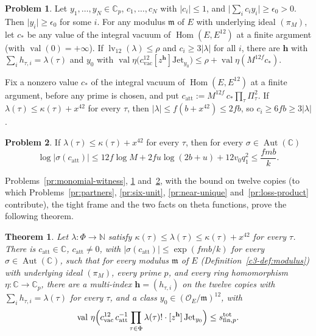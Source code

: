 \documentclass[reqno]{amsart}
\theoremstyle{definition}
\newtheorem{problem}{Problem}[section]
\theoremstyle{plain}
\newtheorem{theorem}{Theorem}[section]
\newcommand{\C}{\mathbb{C}}
\newcommand{\N}{\mathbb{N}}
\newcommand{\Oc}{\mathcal{O}}
\newcommand{\val}{\operatorname{val}}
\newcommand{\lv}{\operatorname{lv}}
\newcommand{\Aut}{\operatorname{Aut}}
\newcommand{\Hom}{\operatorname{Hom}}
\newcommand{\stot}{s^{\mathrm{tot}}_{\mathrm{fin},p}}
\newcommand{\cvac}{c_{\mathrm{vac}}}
\newcommand{\catt}{c_{\mathrm{att}}}
\newcommand{\Jet}{\mathrm{Jet}}
\newcommand{\hb}{\mathbf h}
\begin{document}
\begin{problem}\label{pr:one-column}
Let \(y_1, \dots, y_N \in \C_p\), \(c_1, \dots, c_N\) with \(\lvert c_i\rvert \le 1\), and \(\lvert\sum_i c_iy_i\rvert \ge \epsilon_0 > 0\).  Then \(\lvert y_i\rvert \ge \epsilon_0\) for some \(i\).  For any modulus \(\mathfrak m\) of \(E\) with underlying ideal \((\pi_M)\), let \(c_*\) be any value of the integral vacuum of \(\Hom(E,E^{12})\) at a finite argument (with \(\val(0) = +\infty\)).  If \(\lv_{12}(\lambda) \le \rho\) and \(c_i \ge 3\lvert\lambda\rvert\) for all \(i\), there are \(\hb\) with \(\sum_i h_{\tau,i} = \lambda(\tau)\) and \(y_0\) with \(\val\eta\bigl(\cvac^{12}[z^{\hb}]\Jet_{y_0}\bigr) \le \rho + \val\eta(M^{12f}c_*)\).
\end{problem}

Fix a nonzero value \(c_*\) of the integral vacuum of \(\Hom(E, E^{12})\) at a finite argument, before any prime is chosen, and put \(\catt := M^{12f}\,c_*\prod_\tau \Pi_\tau^2\).  If \(\lambda(\tau) \le \kappa(\tau) + x^{42}\) for every \(\tau\), then \(\lvert\lambda\rvert \le f(b + x^{42}) \le 2fb\), so \(c_i \ge 6fb \ge 3\lvert\lambda\rvert\).

\begin{problem}\label{pr:c-att}
If \(\lambda(\tau) \le \kappa(\tau) + x^{42}\) for every \(\tau\), then for every \(\sigma \in \Aut(\C)\)
\[
  \log\lvert\sigma(\catt)\rvert \le 12f\log M + 2fu\log(2b + u) + 12v_0q_1^2 \le \frac{fmb}{k} .
\]
\end{problem}

Problems~\ref{pr:monomial-witness}, \ref{pr:one-column} and~\ref{pr:c-att}, with the bound on twelve copies (to which Problems~\ref{pr:partners}, \ref{pr:six-unit}, \ref{pr:near-unique} and~\ref{pr:loss-product} contribute), the tight frame and the two facts on theta functions, prove the following theorem.

\begin{theorem}\label{thm:attained}
Let \(\lambda\colon\Phi\to\N\) satisfy \(\kappa(\tau) \le \lambda(\tau) \le \kappa(\tau) + x^{42}\) for every \(\tau\).  There is \(\catt \in \C\), \(\catt \ne 0\), with \(\lvert\sigma(\catt)\rvert \le \exp(fmb/k)\) for every \(\sigma \in \Aut(\C)\), such that for every modulus \(\mathfrak m\) of \(E\) (Definition~\ref{c3-def:modulus}) with underlying ideal \((\pi_M)\), every prime \(p\), and every ring homomorphism \(\eta\colon\C\to\C_p\), there are a multi-index \(\hb = (h_{\tau,i})\) on the twelve copies with \(\sum_{i} h_{\tau,i} = \lambda(\tau)\) for every \(\tau\), and a class \(y_0 \in (\Oc_E/\mathfrak m)^{12}\), with
\[
  \val\,\eta\Bigl(\cvac^{12}\,\catt^{-1}\prod_{\tau\in\Phi}\lambda(\tau)!\cdot[z^{\hb}]\,\Jet_{y_0}\Bigr) \le \stot .
\]
\end{theorem}
\end{document}
